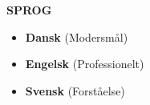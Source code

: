 \documentclass[10pt,a4paper]{article}
\begin{document}
\begin{minipage}[t]{0.32\textwidth}
\begin{tcolorbox}[
        colback=lightbg,
        colframe=bordergray,
        arc=4pt,
        boxrule=1pt,
        top=10pt,
        bottom=10pt,
        left=10pt,
        right=10pt
    ]
        \vspace{0.4cm}
        {\color{primary}\large\bfseries SPROG} \\{}%
        \vspace{0.15cm}
        \begin{itemize}[leftmargin=*,nosep,label=\textcolor{secondary}{\tiny$\blacksquare$}]
            \item \textbf{Dansk} (Modersmål)
            \item \textbf{Engelsk} (Professionelt)
            \item \textbf{Svensk} (Forståelse)
        \end{itemize}
    \end{tcolorbox}

\end{minipage}
\end{document}
